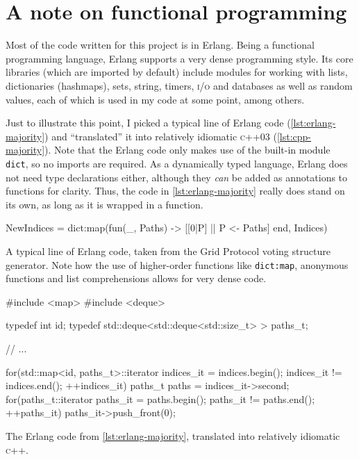 \documentclass[12pt,chapterprefix=true,toc=bibliography,numbers=noendperiod,
               footnotes=multiple,twoside]{scrreprt}
\begin{document}
\section{A note on functional programming}
\label{sc:fp-note}

Most of the code written for this project is in Erlang. Being a functional programming language, Erlang supports a very dense programming style. Its core libraries (which are imported by default) include modules for working with lists, dictionaries (hashmaps), sets, string, timers, \textsc{i/o} and databases as well as random values, each of which is used in my code at some point, among others.

Just to illustrate this point, I picked a typical line of Erlang code (\cref{lst:erlang-majority}) and \enquote{translated} it into relatively idiomatic \textsc{c}++03 (\cref{lst:cpp-majority}). Note that the Erlang code only makes use of the built-in module \texttt{dict}, so no imports are required. As a dynamically typed language, Erlang does not need type declarations either, although they \emph{can} be added as annotations to functions for clarity. Thus, the code in \cref{lst:erlang-majority} really does stand on its own, as long as it is wrapped in a function.

\begin{listing}[h]
    \begin{erlangcode}
NewIndices = dict:map(fun(_, Paths) -> [[0|P] || P <- Paths] end, Indices)
    \end{erlangcode}
    \caption{A typical line of Erlang code, taken from the Grid Protocol voting structure generator. Note how the use of higher-order functions like \texttt{dict:map}, anonymous functions and list comprehensions allows for very dense code.}
    \label{lst:erlang-majority}
\end{listing}

\begin{listing}[h]
    \begin{cppcode}
#include <map>
#include <deque>

typedef int id;
typedef std::deque<std::deque<std::size_t> > paths_t;

// ...

for(std::map<id, paths_t>::iterator indices_it = indices.begin();
        indices_it != indices.end(); ++indices_it) {
    paths_t paths = indices_it->second;
    for(paths_t::iterator paths_it = paths.begin();
            paths_it != paths.end(); ++paths_it) {
        paths_it->push_front(0);
    }
}
    \end{cppcode}
    \caption{The Erlang code from \cref{lst:erlang-majority}, translated into relatively idiomatic \textsc{c}++.}
    \label{lst:cpp-majority}
\end{listing}
\end{document}
